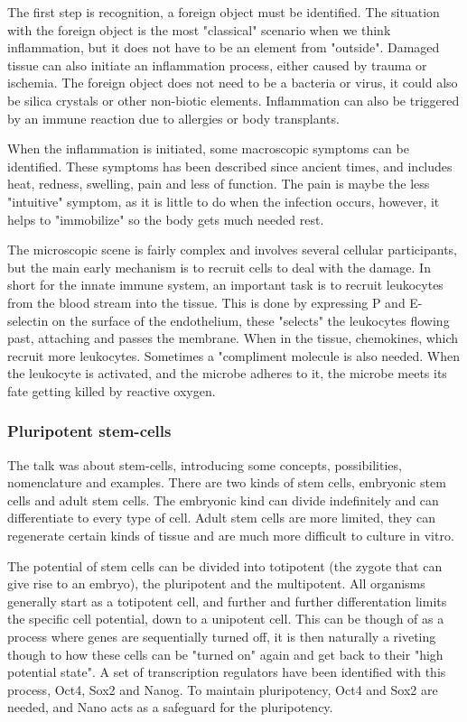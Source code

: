 \documentclass[12p]{article}
\begin{document}
The first step is recognition, a foreign object must be identified.
The situation with the foreign object is the most "classical" scenario when we think inflammation, but it does not have to be an element from "outside".
Damaged tissue can also initiate an inflammation process, either caused by trauma or ischemia.
The foreign object does not need to be a bacteria or virus, it could also be silica crystals or other non-biotic elements.
Inflammation can also be triggered by an immune reaction due to allergies or body transplants.

When the inflammation is initiated, some macroscopic symptoms can be identified.
These symptoms has been described since ancient times, and includes heat, redness, swelling, pain and less of function.
The pain is maybe the less "intuitive" symptom, as it is little to do when the infection occurs, however, it helps to "immobilize" so the body gets much needed rest.

The microscopic scene is fairly complex and involves several cellular participants, but the main early mechanism is to recruit cells to deal with the damage. 
In short for the innate immune system, an important task is to recruit leukocytes from the blood stream into the tissue.
This is done by expressing P and E-selectin on the surface of the endothelium, these "selects" the leukocytes flowing past, attaching and passes the membrane.
When in the tissue, chemokines, which recruit more leukocytes.
Sometimes a "compliment molecule is also needed.
When the leukocyte is activated, and the microbe adheres to it, the microbe meets its fate getting killed by reactive oxygen.

\subsubsection*{Pluripotent stem-cells}

The talk was about stem-cells, introducing some concepts, possibilities, nomenclature and examples.
There are two kinds of stem cells, embryonic stem cells and adult stem cells.
The embryonic kind can divide indefinitely and can differentiate to every type of cell.
Adult stem cells are more limited, they can regenerate certain kinds of tissue and are much more difficult to culture in vitro.

The potential of stem cells can be divided into totipotent (the zygote that can give rise to an embryo), the pluripotent and the multipotent.
All organisms generally start as a totipotent cell, and further and further differentation limits the specific cell potential, down to a unipotent cell.
This can be though of as a process where genes are sequentially turned off, it is then naturally a riveting though to how these cells can be "turned on" again and get back to their "high potential state".
A set of transcription regulators have been identified with this process, Oct4, Sox2 and Nanog.
To maintain pluripotency, Oct4 and Sox2 are needed, and Nano acts as a safeguard for the pluripotency.
\end{document}
